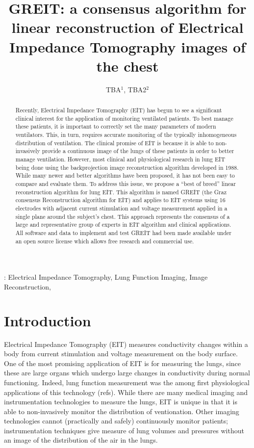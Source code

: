 \documentclass[12pt]{iopart}
\begin{document}
\title[GREIT: reconstruction algorithm for EIT chest images]
      {GREIT: a consensus algorithm for linear reconstruction of
              Electrical Impedance Tomography images of the chest}

\author{TBA$^1$,
        TBA2$^2$}

\address{$^1$ Address \#1}
\address{$^2$ Address \#2}



\begin{abstract}
Recently, Electrical Impedance Tomography (EIT) has begun to see a
significant clinical interest for the application of monitoring
ventilated patients. To best manage these patients, it is important
to correctly set the many parameters of modern ventilators. This,
in turn, requires accurate monitoring of the
typically inhomogeneous distribution of ventilation.
The clinical promise of EIT is because it is able to non-invasively
provide a continuous image of the lungs of these patients in order
to better manage ventilation.
However, most clinical and physiological research in lung EIT
being done using the backprojection image reconstruction algorithm
developed in 1988.  While many newer and better algorithms have been
proposed, it has not been easy to compare and evaluate them.
To address this issue, we propose a ``best of breed'' linear
reconstruction algorithm for lung EIT. This algorithm is named
GREIT (the Graz consensus Reconstruction algorithm for EIT) and
applies to EIT systems using 16 electrodes with adjacent
current stimulation and voltage measurement applied in a single
plane around the subject's chest.
This approach represents the consensus of a large and representative
group of experts in EIT algorithm and clinical applications.
All software and data to implement and test GREIT had been
made available under an open source license which allows free
research and commercial use.
\end{abstract}

:
Electrical Impedance Tomography,
Lung Function Imaging,
Image Reconstruction,

\section{Introduction}
Electrical Impedance Tomography (EIT) measures conductivity
changes within a body from current stimulation and voltage
measurement on the body surface. One of the most promising
application of EIT is for measuring the lungs, since these
are large organs which undergo large changes in conductivity
during normal functioning. Indeed, lung function measurement
was the among first physiological applications of this technology
(refs). While there are many medical imaging and instrumentation
technologies to measure the lungs, EIT is unique in that it
is able to non-invasively monitor the distribution of 
ventionation. Other imaging technologies cannot (practically 
and safely) continuously monitor patients; instrumentation
techniques give measure of lung volumes and pressures without
an image of the distribution of the air in the lungs. 
\end{document}
